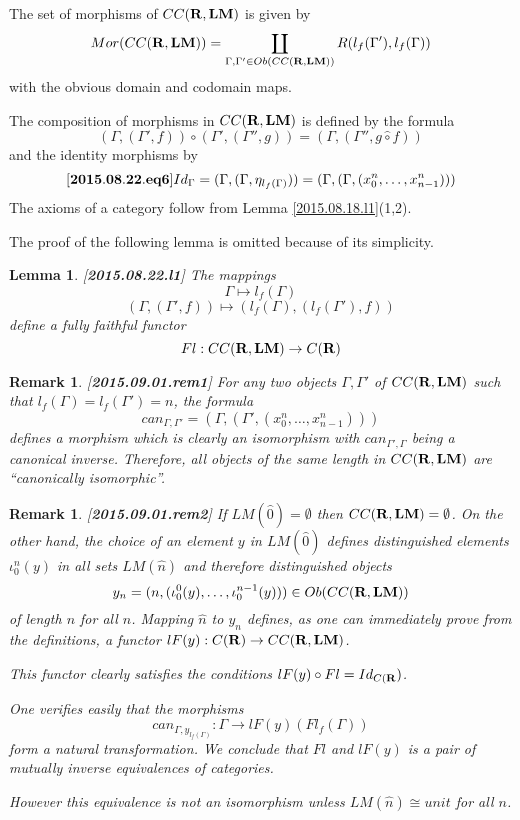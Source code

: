 \documentclass[11pt]{article}
\newenvironment{eq}{\begin{equation}}{\end{equation}}
\newtheorem{lemma}[proposition]{Lemma}
\newtheorem{remark}[proposition]{Remark}
\newcommand{\llabel}[1]{\label{#1}[{\bf #1}]}
\newcommand{\sr}{\rightarrow}
\newcommand{\rr}{{\bf R}}
\newcommand{\lm}{{\bf LM}}
\newcommand{\wh}{\widehat}
\newcommand{\hc}{\wh{\circ}}
\begin{document}
The set of morphisms of $CC(\rr,\lm)$ is given by
%
$$Mor(CC(\rr,\lm))=\coprod_{\Gamma,\Gamma'\in Ob(CC(\rr,\lm))} R(l_f(\Gamma'),l_f(\Gamma))$$
%
with the obvious domain and codomain maps. 

The composition of morphisms in $CC(\rr,\lm)$ is defined by the formula
%
$$(\Gamma,(\Gamma',f))\circ (\Gamma',(\Gamma'',g))=(\Gamma,(\Gamma'', g\hc f))$$
%
and the identity morphisms by
%
\begin{eq}\llabel{2015.08.22.eq6}
Id_{\Gamma}=(\Gamma,(\Gamma, \eta_{l_f(\Gamma)}))=(\Gamma,(\Gamma,(x^n_0,\dots,x^n_{n-1})))
\end{eq}
%
The axioms of a category follow from Lemma \ref{2015.08.18.l1}(1,2). 


The proof of the following lemma is omitted because of its simplicity.
%
\begin{lemma}
\llabel{2015.08.22.l1}
The mappings 
%
$$\Gamma\mapsto l_f(\Gamma)$$
$$(\Gamma,(\Gamma',f))\mapsto (l_f(\Gamma),(l_f(\Gamma'),f))$$
%
define a fully faithful functor 
%
$$Fl:CC(\rr,\lm)\sr C(\rr)$$
%
\end{lemma}
%
\begin{remark}\rm
\llabel{2015.09.01.rem1}
For any two objects $\Gamma,\Gamma'$ of $CC(\rr,\lm)$ such that $l_f(\Gamma)=l_f(\Gamma')=n$, the formula
%
$$can_{\Gamma,\Gamma'}=(\Gamma,(\Gamma',(x_0^n,\dots,x_{n-1}^n)))$$
%
defines a morphism which is clearly an isomorphism with $can_{\Gamma',\Gamma}$ being a canonical inverse. Therefore, all objects of the same length in $CC(\rr,\lm)$ are ``canonically isomorphic''. 
\end{remark}
%
\begin{remark}\rm
\llabel{2015.09.01.rem2}
If $LM(\wh{0})=\emptyset$ then $CC(\rr,\lm)=\emptyset$. On the other hand, the choice of an element $y$ in $LM(\wh{0})$ defines distinguished elements $\iota_0^n(y)$ in all sets $LM(\wh{n})$ and therefore distinguished objects 
%
$$y_n=(n,(\iota_0^0(y),\dots,\iota_0^{n-1}(y)))\in Ob(CC(\rr,\lm))$$
%
of length $n$ for all $n$. Mapping $\wh{n}$ to $y_n$ defines, as one can immediately prove from the definitions, a functor $lF(y):C(\rr)\sr CC(\rr,\lm)$. 

This functor clearly satisfies the conditions $lF(y)\circ Fl=Id_{C(\rr})$.

One verifies easily that the morphisms 
%
$$can_{\Gamma,y_{l_f(\Gamma)}}:\Gamma\sr lF(y)(Fl_f(\Gamma))$$
%
form a natural transformation. We conclude that $Fl$ and $lF(y)$ is a pair of mutually inverse equivalences of categories.

However this equivalence is not an isomorphism unless $LM(\wh{n})\cong unit$ for all $n$.
\end{remark}
%
\end{document}
